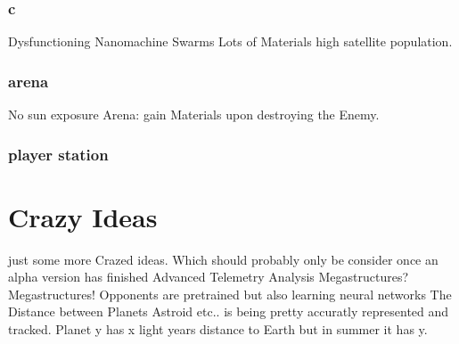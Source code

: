 \documentclass[a4paper]{scrreprt}
\begin{document}
\begin{alpha-feature}
            \subsection{c}
                Dysfunctioning Nanomachine Swarms
                Lots of Materials
                high satellite population.
            \subsection{arena}
                No sun exposure
                Arena: gain Materials upon destroying the Enemy.
            \subsection{player station}
\end{alpha-feature}
        

\chapter{Crazy Ideas}
just some more Crazed ideas. Which should probably only be consider once an alpha version has finished
    Advanced Telemetry Analysis
    Megastructures?Megastructures!
    Opponents are pretrained but also learning neural networks
    The Distance between Planets Astroid etc.. is being pretty accuratly represented and tracked. Planet y has x light years distance to Earth but in summer it has y. 
\end{document}
